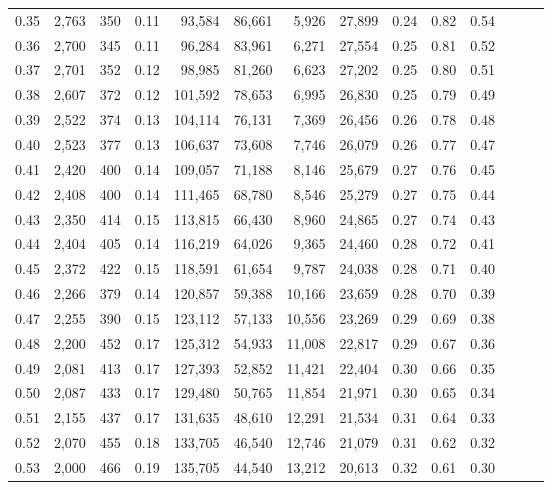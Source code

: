 \begin{tabular}{rrrrrrrrrrrrrr}
0.35 &  2,763 &    350 &  0.11 &   93,584 &   86,661 &   5,926 &  27,899 &  0.24 &  0.82 &      0.54 \\
0.36 &  2,700 &    345 &  0.11 &   96,284 &   83,961 &   6,271 &  27,554 &  0.25 &  0.81 &      0.52 \\
0.37 &  2,701 &    352 &  0.12 &   98,985 &   81,260 &   6,623 &  27,202 &  0.25 &  0.80 &      0.51 \\
0.38 &  2,607 &    372 &  0.12 &  101,592 &   78,653 &   6,995 &  26,830 &  0.25 &  0.79 &      0.49 \\
0.39 &  2,522 &    374 &  0.13 &  104,114 &   76,131 &   7,369 &  26,456 &  0.26 &  0.78 &      0.48 \\
0.40 &  2,523 &    377 &  0.13 &  106,637 &   73,608 &   7,746 &  26,079 &  0.26 &  0.77 &      0.47 \\
0.41 &  2,420 &    400 &  0.14 &  109,057 &   71,188 &   8,146 &  25,679 &  0.27 &  0.76 &      0.45 \\
0.42 &  2,408 &    400 &  0.14 &  111,465 &   68,780 &   8,546 &  25,279 &  0.27 &  0.75 &      0.44 \\
0.43 &  2,350 &    414 &  0.15 &  113,815 &   66,430 &   8,960 &  24,865 &  0.27 &  0.74 &      0.43 \\
0.44 &  2,404 &    405 &  0.14 &  116,219 &   64,026 &   9,365 &  24,460 &  0.28 &  0.72 &      0.41 \\
0.45 &  2,372 &    422 &  0.15 &  118,591 &   61,654 &   9,787 &  24,038 &  0.28 &  0.71 &      0.40 \\
0.46 &  2,266 &    379 &  0.14 &  120,857 &   59,388 &  10,166 &  23,659 &  0.28 &  0.70 &      0.39 \\
0.47 &  2,255 &    390 &  0.15 &  123,112 &   57,133 &  10,556 &  23,269 &  0.29 &  0.69 &      0.38 \\
0.48 &  2,200 &    452 &  0.17 &  125,312 &   54,933 &  11,008 &  22,817 &  0.29 &  0.67 &      0.36 \\
0.49 &  2,081 &    413 &  0.17 &  127,393 &   52,852 &  11,421 &  22,404 &  0.30 &  0.66 &      0.35 \\
0.50 &  2,087 &    433 &  0.17 &  129,480 &   50,765 &  11,854 &  21,971 &  0.30 &  0.65 &      0.34 \\
0.51 &  2,155 &    437 &  0.17 &  131,635 &   48,610 &  12,291 &  21,534 &  0.31 &  0.64 &      0.33 \\
0.52 &  2,070 &    455 &  0.18 &  133,705 &   46,540 &  12,746 &  21,079 &  0.31 &  0.62 &      0.32 \\
0.53 &  2,000 &    466 &  0.19 &  135,705 &   44,540 &  13,212 &  20,613 &  0.32 &  0.61 &      0.30 \\

\end{tabular}
